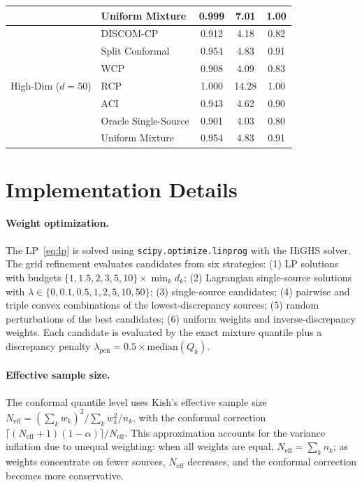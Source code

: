 \documentclass{article}
\newcommand{\DISCOM}{\textsc{DISCOM-CP}}
\begin{document}
\begin{table}[h]
\begin{tabular}{llccc}
& Uniform Mixture & 0.999 & 7.01 & 1.00 \\
\midrule
\multirow{7}{*}{High-Dim ($d\!=\!50$)} & \DISCOM{} & 0.912 & 4.18 & 0.82 \\
& Split Conformal & 0.954 & 4.83 & 0.91 \\
& WCP & 0.908 & 4.09 & 0.83 \\
& RCP & 1.000 & 14.28 & 1.00 \\
& ACI & 0.943 & 4.62 & 0.90 \\
& Oracle Single-Source & 0.901 & 4.03 & 0.80 \\
& Uniform Mixture & 0.954 & 4.83 & 0.91 \\
\bottomrule
\end{tabular}
\end{table}

\section{Implementation Details}
\label{app:implementation}

\paragraph{Weight optimization.}
The LP~\eqref{eq:lp} is solved using \texttt{scipy.optimize.linprog} with the HiGHS solver. The grid refinement evaluates candidates from six strategies: (1) LP solutions with budgets $\{1, 1.5, 2, 3, 5, 10\} \times \min_k d_k$; (2) Lagrangian single-source solutions with $\lambda \in \{0, 0.1, 0.5, 1, 2, 5, 10, 50\}$; (3) single-source candidates; (4) pairwise and triple convex combinations of the lowest-discrepancy sources; (5) random perturbations of the best candidates; (6) uniform weights and inverse-discrepancy weights. Each candidate is evaluated by the exact mixture quantile plus a discrepancy penalty $\lambda_{\text{pen}} = 0.5 \times \text{median}(Q_k)$.

\paragraph{Effective sample size.}
The conformal quantile level uses Kish's effective sample size~\citep{kish1965survey} $N_{\text{eff}} = (\sum_k w_k)^2 / \sum_k w_k^2 / n_k$, with the conformal correction $\lceil (N_{\text{eff}} + 1)(1-\alpha) \rceil / N_{\text{eff}}$. This approximation accounts for the variance inflation due to unequal weighting: when all weights are equal, $N_{\text{eff}} = \sum_k n_k$; as weights concentrate on fewer sources, $N_{\text{eff}}$ decreases, and the conformal correction becomes more conservative.
\end{document}
